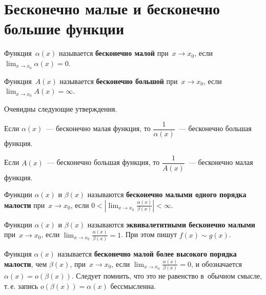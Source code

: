 \section{Бесконечно малые и бесконечно большие функции}
 Функция~$\alpha(x)$ называется \textbf{бесконечно малой} при~$x \to x_0$, если $\displaystyle \lim_{x \to x_0} \alpha(x) = 0$.

 Функция~$A(x)$ называется \textbf{бесконечно большой} при~$x \to x_0$, если $\displaystyle \lim_{x \to x_0} A(x) = \infty$.

Очевидны следующие утверждения.
\begin{statement}
Если $\alpha(x)$~--- бесконечно малая функция, то $\dfrac1{\alpha(x)}$~--- бесконечно большая функция.
\end{statement}

\begin{statement}
Если $A(x)$~--- бесконечно большая функция, то $\dfrac1{A(x)}$~--- бесконечно малая функция.
\end{statement}

Функции $\alpha(x)$ и $\beta(x)$ называются \textbf{бесконечно малыми одного порядка малости} при~$x \to x_0$, если
$\displaystyle 0 < \left| \lim_{x \to x_0} \frac{\alpha(x)}{\beta(x)} \right| < \infty$.

Функции $\alpha(x)$ и $\beta(x)$ называются \textbf{эквивалетнтными бесконечно малыми} при~$x \to x_0$, если
$\displaystyle \lim_{x \to x_0} \frac{\alpha(x)}{\beta(x)} = 1$.
При этом пишут $f(x) \sim g(x)$.

Функция $\alpha(x)$ называется \textbf{бесконечно малой более высокого порядка малости}, чем $\beta(x)$, при~$x \to x_0$, если
$\displaystyle \lim_{x \to x_0} \frac{\alpha(x)}{\beta(x)} = 0$, и обозначается $\alpha(x) = o(\beta(x))$.
Следует помнить, что это не равенство в~обычном смысле, т.\,е. запись $o(\beta(x)) = \alpha(x)$ бессмысленна.